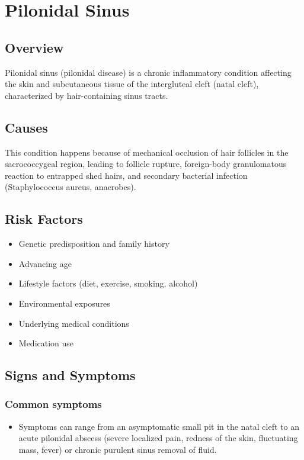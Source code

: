 \chapter{Pilonidal Sinus}
\label{sec:Pilonidal Sinus}

\section{Overview}
Pilonidal sinus (pilonidal disease) is a chronic inflammatory condition affecting the skin and subcutaneous tissue of the intergluteal cleft (natal cleft), characterized by hair-containing sinus tracts.
\section{Causes}
This condition happens because of mechanical occlusion of hair follicles in the sacrococcygeal region, leading to follicle rupture, foreign-body granulomatous reaction to entrapped shed hairs, and secondary bacterial infection (Staphylococcus aureus, anaerobes).     
\section{Risk Factors}

\begin{itemize}[noitemsep]
  \item Genetic predisposition and family history
  \item Advancing age
  \item Lifestyle factors (diet, exercise, smoking, alcohol)
  \item Environmental exposures
  \item Underlying medical conditions
  \item Medication use
\end{itemize}
\section{Signs and Symptoms}

\subsection{Common symptoms}
\begin{itemize}[noitemsep]
  \item Symptoms can range from an asymptomatic small pit in the natal cleft to an acute pilonidal abscess (severe localized pain, redness of the skin, fluctuating mass, fever) or chronic purulent sinus removal of fluid. 
  \end{itemize}

